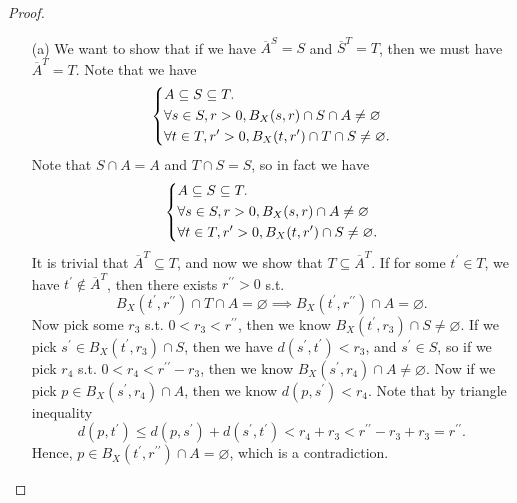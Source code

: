 \begin{proof}
  \vphantom{text}
  \begin{itemize}
    \item [(a)] We want to show that if we have \(\overline{A}^S = S \) and \(\overline{S}^T = T \), then we must have \(\overline{A}^T = T \). Note that we have 
    \[
      \begin{dcases}
        A \subseteq S \subseteq T. \\
        \forall s \in S, r > 0, B_X(s, r) \cap S \cap A \neq \varnothing \\
        \forall t \in T, r^{\prime} > 0, B_X(t, r^{\prime} ) \cap T \cap S \neq \varnothing .
      \end{dcases}
    \]
    Note that \(S \cap A = A\) and \(T \cap S = S\), so in fact we have 
    \[
      \begin{dcases}
        A \subseteq S \subseteq T. \\
        \forall s \in S, r > 0, B_X(s, r) \cap A \neq \varnothing \\
        \forall t \in T, r^{\prime} > 0, B_X(t, r^{\prime} ) \cap S \neq \varnothing .
      \end{dcases}
    \]  
    It is trivial that \(\overline{A}^T \subseteq T \), and now we show that \(T \subseteq \overline{A}^T \). If for some \(t^{\prime} \in T\), we have \(t^{\prime} \notin \overline{A}^T\), then there exists \(r^{\prime\prime} > 0\) s.t. 
    \[
      B_X(t^{\prime} ,r^{\prime\prime} ) \cap T \cap A = \varnothing \implies B_X(t^{\prime} ,r^{\prime\prime} ) \cap A = \varnothing . 
    \]
    Now pick some \(r_3\) s.t. \(0 < r_3 < r^{\prime\prime} \), then we know \(B_X(t^{\prime} ,r_3) \cap S \neq \varnothing \). If we pick \(s^{\prime} \in B_X(t^{\prime} ,r_3) \cap S\), then we have \(d(s^{\prime} , t^{\prime} ) < r_3\), and \(s^{\prime} \in S\), so if we pick \(r_4\) s.t. \(0 < r_4 < r^{\prime\prime} - r_3\), then we know \(B_X(s^{\prime} , r_4) \cap A \neq \varnothing \). Now if we pick \(p \in B_X(s^{\prime} , r_4) \cap A\), then we know \(d(p, s^{\prime} )<r_4\). Note that by triangle inequality 
    \[
      d(p, t^{\prime} ) \le d(p, s^{\prime} ) + d(s^{\prime} , t^{\prime} ) < r_4 + r_3 < r^{\prime\prime} - r_3 + r_3 = r^{\prime\prime} .
    \]     Hence, \(p \in B_X(t^{\prime} , r^{\prime\prime} ) \cap A = \varnothing \), which is a contradiction.         


\end{itemize}
\end{proof}
